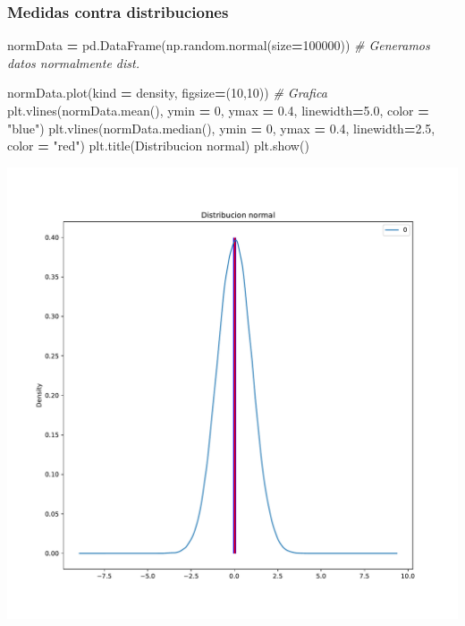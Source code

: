 \documentclass[
]{article}
\newenvironment{Shaded}{\begin{snugshade}}{\end{snugshade}}
\newcommand{\CommentTok}[1]{\textcolor[rgb]{0.56,0.35,0.01}{\textit{#1}}}
\newcommand{\DecValTok}[1]{\textcolor[rgb]{0.00,0.00,0.81}{#1}}
\newcommand{\FloatTok}[1]{\textcolor[rgb]{0.00,0.00,0.81}{#1}}
\newcommand{\NormalTok}[1]{#1}
\newcommand{\OperatorTok}[1]{\textcolor[rgb]{0.81,0.36,0.00}{\textbf{#1}}}
\newcommand{\StringTok}[1]{\textcolor[rgb]{0.31,0.60,0.02}{#1}}
\begin{document}
\hypertarget{medidas-contra-distribuciones}{%
\subsubsection{Medidas contra
distribuciones}\label{medidas-contra-distribuciones}}

\begin{Shaded}
\begin{Highlighting}[]
\NormalTok{normData }\OperatorTok{=}\NormalTok{ pd.DataFrame(np.random.normal(size}\OperatorTok{=}\DecValTok{100000}\NormalTok{)) }\CommentTok{\# Generamos datos normalmente dist.}

\NormalTok{normData.plot(kind }\OperatorTok{=} \StringTok{\textquotesingle{}density\textquotesingle{}}\NormalTok{, figsize}\OperatorTok{=}\NormalTok{(}\DecValTok{10}\NormalTok{,}\DecValTok{10}\NormalTok{)) }\CommentTok{\# Grafica}
\NormalTok{plt.vlines(normData.mean(), ymin }\OperatorTok{=} \DecValTok{0}\NormalTok{, ymax }\OperatorTok{=} \FloatTok{0.4}\NormalTok{,}
\NormalTok{linewidth}\OperatorTok{=}\FloatTok{5.0}\NormalTok{, color }\OperatorTok{=} \StringTok{"blue"}\NormalTok{)}
\NormalTok{plt.vlines(normData.median(), ymin }\OperatorTok{=} \DecValTok{0}\NormalTok{, ymax }\OperatorTok{=} \FloatTok{0.4}\NormalTok{,}
\NormalTok{linewidth}\OperatorTok{=}\FloatTok{2.5}\NormalTok{, color }\OperatorTok{=} \StringTok{"red"}\NormalTok{)}
\NormalTok{plt.title(}\StringTok{\textquotesingle{}Distribucion normal\textquotesingle{}}\NormalTok{)}
\NormalTok{plt.show()}
\end{Highlighting}
\end{Shaded}

\begin{center}\includegraphics{Ejercicio-de-los-Carros_files/figure-latex/unnamed-chunk-4-1} \end{center}
\end{document}
